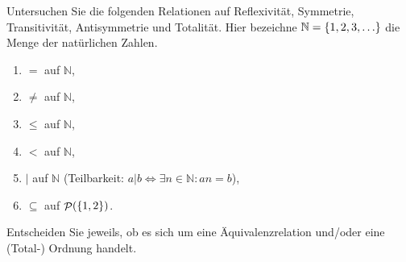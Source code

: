 \documentclass[german,12pt]{homework}
\newcommand{\NN}{\mathbb{N}}
\DeclareMathOperator{\pot}{\mathcal{P}}
\DeclarePairedDelimiter{\enbrace}{(}{)}
\DeclarePairedDelimiter{\penbrace}{\{}{\}}
\begin{document}
    \begin{problem}
        Untersuchen Sie die folgenden Relationen auf Reflexivität, Symmetrie, Transitivität, Antisymmetrie und Totalität. Hier bezeichne \(\NN = \penbrace*{1, 2, 3, \ldots}\) die Menge der natürlichen Zahlen.
        \begin{enumerate}
            \item \(=\) auf \(\NN\),
            \item \(\ne\) auf \(\NN\),
            \item \(\le\) auf \(\NN\),
            \item \(<\) auf \(\NN\),
            \item \(|\) auf \(\NN\) (Teilbarkeit: \(a | b \iff \exists{n \in \NN}: an = b\)),
            \item \(\subseteq\) auf \(\pot\enbrace*{\penbrace*{1, 2}}\).
        \end{enumerate}
        Entscheiden Sie jeweils, ob es sich um eine Äquivalenzrelation und/oder eine (Total-) Ordnung handelt.
    \end{problem}
\end{document}
